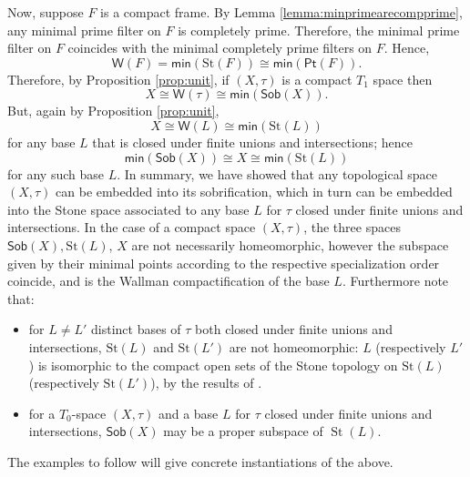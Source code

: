 \documentclass{article}
\theoremstyle{plain}
\theoremstyle{definition}
\theoremstyle{remark}
\DeclareMathOperator{\St}{St}
\newcommand{\bool}[1]{\mathsf{#1}}
\newcommand{\0}{\mathbbm 0}
\newcommand{\1}{\mathbbm 1}
\newcommand{\2}{\mathbbm 2}
\begin{document}
Now, suppose \(F\) is a compact frame. By Lemma \ref{lemma:minprimearecompprime}, any minimal prime filter on \(F\) is completely prime. Therefore, the minimal prime filter on \(F\) coincides with the minimal completely prime filters on \(F\).  
Hence, 
\[
\bool{W}(F)=  \bool{min}( \mathrm{St}(F))\cong \bool{min}( \bool{Pt}(F)).
\]  
Therefore, by Proposition \ref{prop:unit}, if \((X,\tau)\) is a compact  \(T_1\) space then \[
X \cong \bool{W}(\tau)  \cong  \bool{min}(\bool{Sob}(X)).\]
But, again by Proposition \ref{prop:unit}, \[
X \cong \bool{W}(L)  \cong  \bool{min}(\mathrm{St}(L))\]
for any base \(L\) that is closed under finite unions and intersections; hence
\[
\bool{min}(\bool{Sob}(X)) \cong X \cong \bool{min}(\mathrm{St}(L))\]
for any such base $L$. 
In summary, we have showed that any topological space \((X,\tau)\) can be embedded into its sobrification, which in turn can be embedded into the Stone space associated to any base \(L\) for \(\tau\) closed under finite unions and intersections. In the case of a compact space $(X,\tau)$, the three spaces $\bool{Sob}(X), \mathrm{St}(L)$, $X$ are not necessarily homeomorphic, however the subspace given by their minimal points according to the respective specialization order coincide, and is the Wallman compactification of the base $L$. Furthermore note that:
\begin{itemize}
\item 
for $L\neq L'$ distinct bases of $\tau$ both closed under finite unions and intersections, $\mathrm{St}(L)$ and $\mathrm{St}(L')$ are not homeomorphic: $L$ (respectively $L'$) is isomorphic to the compact open sets of the Stone topology on $\mathrm{St}(L)$ (respectively $\mathrm{St}(L')$), by the results of \cite[Section 6.1]{gehrke2024topological}.
\item
for   a $T_0$-space $(X,\tau)$ and  a base $L$ for $\tau$ closed under finite unions and intersections, $\bool{Sob}(X)$ may be a proper subspace of $\St(L)$. 
\end{itemize}
The examples to follow will give concrete instantiations of the above.
\end{document}
